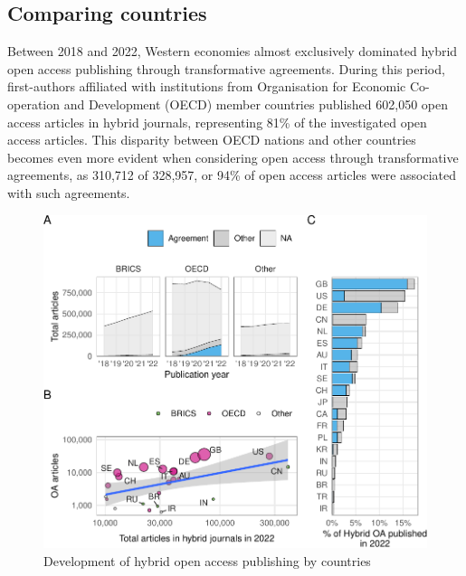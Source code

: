 \documentclass[a4paper,man,floatsintext,longtable,noextraspace,12pt]{apa6}
\begin{document}
\hypertarget{comparing-countries}{%
\subsection{Comparing countries}\label{comparing-countries}}

Between 2018 and 2022, Western economies almost exclusively dominated
hybrid open access publishing through transformative agreements. During
this period, first-authors affiliated with institutions from
Organisation for Economic Co-operation and Development (OECD) member
countries published 602,050 open access articles in hybrid journals,
representing 81\% of the investigated open access articles. This
disparity between OECD nations and other countries becomes even more
evident when considering open access through transformative agreements,
as 310,712 of 328,957, or 94\% of open access articles were associated
with such agreements.

\begin{figure}[ht!]

{\centering \includegraphics[width=0.99\linewidth,]{fig/country_patch-1} 

}

\caption{Development of hybrid open access publishing by countries}\label{fig:country_patch}
\end{figure}
\end{document}
